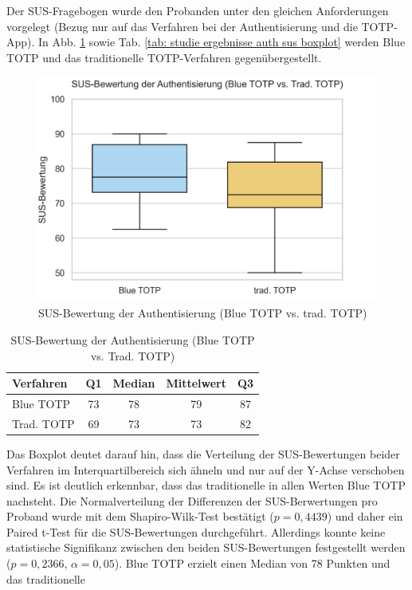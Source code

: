 Der SUS-Fragebogen wurde den Probanden unter den gleichen Anforderungen vorgelegt 
(Bezug nur auf das Verfahren bei der Authentisierung und die TOTP-App).
In Abb. \ref{fig: studie ergebnisse auth sus boxplot} sowie Tab. \ref{tab: studie 
ergebnisse auth sus boxplot} werden Blue TOTP und das traditionelle TOTP-Verfahren 
gegenübergestellt.
\begin{figure}
    \centering
    \includegraphics[width=0.6\linewidth]{data_processing/questionaires/results/usage_sus_boxplot.png}
    \caption[SUS-Bewertung der Authentisierung (Blue TOTP vs. trad. TOTP)]{SUS-Bewertung der Authentisierung (Blue TOTP vs. trad. TOTP)}
    \label{fig: studie ergebnisse auth sus boxplot}
\end{figure}
\begin{table}
    \begin{center}
    \begin{tabular}{| l | c | c | c | c |}
        \hline
        \textbf{Verfahren} & \textbf{Q1} & \textbf{Median} & \textbf{Mittelwert} & \textbf{Q3}  \\
        \hline
        Blue TOTP & 73 & 78 & 79 & 87 \\
        \hline
        Trad. TOTP & 69 & 73 & 73 & 82 \\ 
        \hline
    \end{tabular}
    \end{center}
    \caption[SUS-Bewertung der Authentisierung (Blue TOTP vs. Trad. TOTP)]{SUS-Bewertung der Authentisierung (Blue TOTP vs. Trad. TOTP)}
    \label{tab: studie ergebnisse auth sus boxplot}
\end{table}
Das Boxplot deutet darauf hin, dass die Verteilung der SUS-Bewertungen beider 
Verfahren im Interquartilbereich sich ähneln und nur auf der Y-Achse verschoben sind. 
Es ist deutlich erkennbar, dass das traditionelle in allen Werten Blue TOTP 
nachsteht. Die Normalverteilung der Differenzen der SUS-Berwertungen pro Proband wurde mit dem Shapiro-Wilk-Test bestätigt ($p=0{,}4439$) und daher ein Paired t-Test für die SUS-Bewertungen durchgeführt. Allerdings konnte keine statistische Signifikanz zwischen den beiden SUS-Bewertungen festgestellt werden ($p=0{,}2366$, $\alpha = 0{,}05$). Blue TOTP erzielt einen Median von 78 Punkten und das traditionelle 
